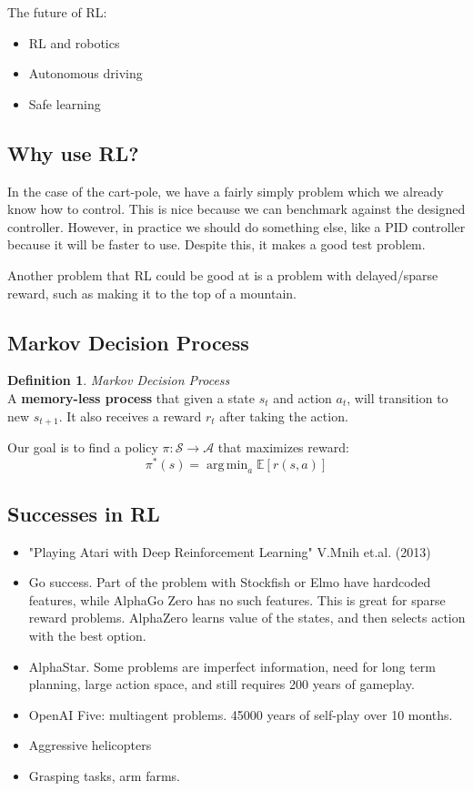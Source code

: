 \documentclass{article}
\theoremstyle{definition}
\newtheorem{definition}{Definition}[section]
\newcommand{\Def}[2]{
\begin{shaded*}
\begin{definition}{\textit{#1}}\\#2\end{definition}
\end{shaded*}
}
\DeclareMathOperator*{\argmin}{arg\,min}
\begin{document}
The future of RL:
\begin{itemize}
	\item RL and robotics
	\item Autonomous driving
	\item Safe learning
\end{itemize}

\subsection{Why use RL?}
In the case of the cart-pole, we have a fairly simply problem which we already know how to control. This is nice because we can benchmark against the designed controller. However, in practice we should do something else, like a PID controller because it will be faster to use. Despite this, it makes a good test problem.

Another problem that RL could be good at is a problem with delayed/sparse reward, such as making it to the top of a mountain.

\subsection{Markov Decision Process}

\Def{Markov Decision Process}{A \textbf{memory-less process} that given a state $s_t$ and action $a_t$, will transition to new $s_{t+1}$. It also receives a reward $r_t$ after taking the action. }


Our goal is to find a policy $\pi:\mathcal{S} \to \mathcal{A}$ that maximizes reward:
$$\pi^*(s) = \argmin_a \mathbb{E}[r(s,a)]$$

\subsection{Successes in RL}
\begin{itemize}
	\item "Playing Atari with Deep Reinforcement Learning" V.Mnih et.al. (2013)
	\item Go success. Part of the problem with Stockfish or Elmo have hardcoded features, while AlphaGo Zero has no such features. This is great for sparse reward problems. AlphaZero learns value of the states, and then selects action with the best option.
	\item AlphaStar. Some problems are imperfect information, need for long term planning, large action space, and still requires 200 years of gameplay.
	\item OpenAI Five: multiagent problems. 45000 years of self-play over 10 months.
	\item Aggressive helicopters
	\item Grasping tasks, arm farms. 
\end{itemize}
\end{document}
